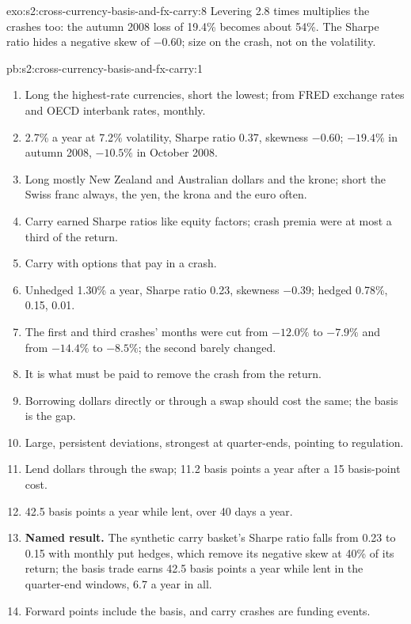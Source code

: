 \begin{solution}{exo:s2:cross-currency-basis-and-fx-carry:8}
Levering 2.8 times multiplies the crashes too: the autumn 2008 loss of 19.4\% becomes about 54\%. The Sharpe ratio hides a negative skew of $-0.60$;
size on the crash, not on the volatility.
\end{solution}

\begin{solution}{pb:s2:cross-currency-basis-and-fx-carry:1}
\begin{enumerate}
\item Long the highest-rate currencies, short the lowest; from FRED exchange rates and OECD interbank rates, monthly.
\item 2.7\% a year at 7.2\% volatility, Sharpe ratio 0.37, skewness $-0.60$; $-19.4\%$ in autumn 2008, $-10.5\%$ in October 2008.
\item Long mostly New Zealand and Australian dollars and the krone; short the Swiss franc always, the yen, the krona and the euro often.
\item Carry earned Sharpe ratios like equity factors; crash premia were at most a third of the return.
\item Carry with options that pay in a crash.
\item Unhedged 1.30\% a year, Sharpe ratio 0.23, skewness $-0.39$; hedged 0.78\%, 0.15, 0.01.
\item The first and third crashes' months were cut from $-12.0\%$ to $-7.9\%$ and from $-14.4\%$ to $-8.5\%$; the second barely changed.
\item It is what must be paid to remove the crash from the return.
\item Borrowing dollars directly or through a swap should cost the same; the basis is the gap.
\item Large, persistent deviations, strongest at quarter-ends, pointing to regulation.
\item Lend dollars through the swap; 11.2 basis points a year after a 15 basis-point cost.
\item 42.5 basis points a year while lent, over 40 days a year.
\item \textbf{Named result.} The synthetic carry basket's Sharpe ratio falls from 0.23 to 0.15 with monthly put hedges, which remove its negative skew
at 40\% of its return; the basis trade earns 42.5 basis points a year while lent in the quarter-end windows, 6.7 a year in all.
\item Forward points include the basis, and carry crashes are funding events.

\end{enumerate}
\end{solution}
